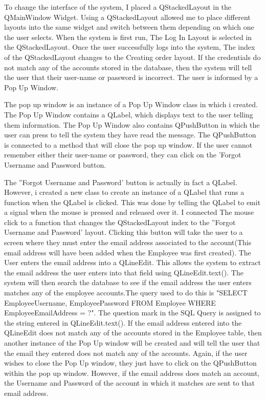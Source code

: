 To change the interface of the system, I placed a QStackedLayout in the QMainWindow Widget. Using a QStackedLayout allowed me to place different layouts into the same widget and switch between them depending on which one the user selects. When the system is first run, The Log In Layout is selected in the QStackedLayout. Once the user successfully logs into the system, The index of the QStackedLayout changes to the Creating order layout. If the credentials do not match any of the accounts stored in the database, then the system will tell the user that their user-name or password is incorrect. The user is informed by a Pop Up Window.

The pop up window is an instance of a Pop Up Window class in which i created. The Pop Up Window contains a QLabel, which displays text to the user telling them information. The Pop Up Window also contains QPushButton in which the user can press to tell the system they have read the message. The QPushButton is connected to a method that will close the pop up window. If the user cannot remember either their user-name or password, they can click on the 'Forgot Username and Password button. 

The ''Forgot Username and Password' button is actually in fact a QLabel. However, i created a new class to create an instance of a QLabel that runs a function when the QLabel is clicked. This was done by telling the QLabel to emit a signal when the mouse is pressed and released over it. I connected The mouse click to a function that changes the QStackedLayout index to the ''Forgot Username and Password' layout. Clicking this button will take the user to a screen where they must enter the email address associated to the account(This email address will have been added when the Employee was first created). The User enters the email address into a QLineEdit. This allows the system to extract the email address the user enters into that field using QLineEdit.text(). The system will then search the database to see if the email address the user enters matches any of the employee accounts.The query used to do this is "SELECT EmployeeUsername, EmployeePassword FROM Employee WHERE EmployeeEmailAddress = ?". The question mark in the SQL Query is assigned to the string entered in QLineEdit.text(). If the email address entered into the QLineEdit does not match any of the accounts stored in the Employee table, then another instance of the Pop Up window will be created and will tell the user that the email they entered does not match any of the accounts. Again, if the user wishes to close the Pop Up window, they just have to click on the QPushButton within the pop up window. However, if the email address does match an account, the Username and Password of the account in which it matches are sent to that email address.

